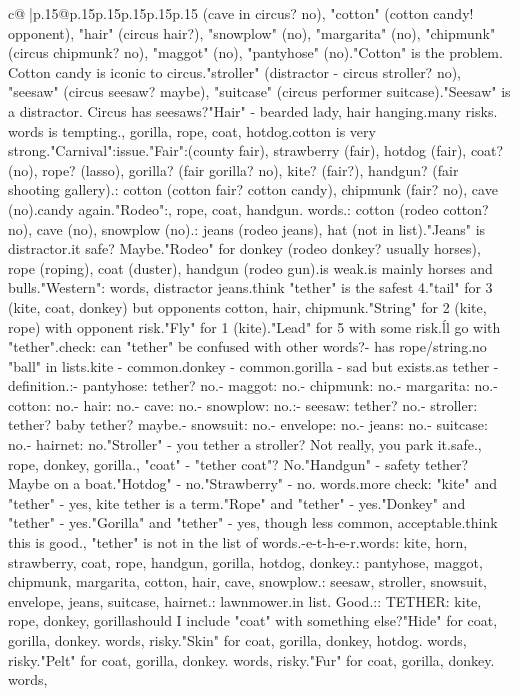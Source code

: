 \documentclass{article}
\begin{document}
{\begin{supertabular}{c@{$\;$}|p{.15\linewidth}@{}p{.15\linewidth}p{.15\linewidth}p{.15\linewidth}p{.15\linewidth}p{.15\linewidth}}
{{{(cave in circus? no), "cotton" (cotton candy! opponent), "hair" (circus hair?), "snowplow" (no), "margarita" (no), "chipmunk" (circus chipmunk? no), "maggot" (no), "pantyhose" (no).\n"Cotton" is the problem. Cotton candy is iconic to circus.\nAlso "stroller" (distractor - circus stroller? no), "seesaw" (circus seesaw? maybe), "suitcase" (circus performer suitcase).\n"Seesaw" is a distractor. Circus has seesaws?\n"Hair" - bearded lady, hair hanging.\nSo many risks. words is tempting.\nDonkey, gorilla, rope, coat, hotdog.\nBut cotton is very strong.\n\n"Carnival":\nSame issue.\n\n"Fair":\nDonkey (county fair), strawberry (fair), hotdog (fair), coat? (no), rope? (lasso), gorilla? (fair gorilla? no), kite? (fair?), handgun? (fair shooting gallery).\nOpponents: cotton (cotton fair? cotton candy), chipmunk (fair? no), cave (no).\nCotton candy again.\n\n"Rodeo":\nDonkey, rope, coat, handgun. words.\nOpponents: cotton (rodeo cotton? no), cave (no), snowplow (no).\nDistractors: jeans (rodeo jeans), hat (not in list).\n"Jeans" is distractor.\nIs it safe? Maybe.\n"Rodeo" for donkey (rodeo donkey? usually horses), rope (roping), coat (duster), handgun (rodeo gun).\nDonkey is weak.\nRodeo is mainly horses and bulls.\n\n"Western": words, distractor jeans.\n\nI think "tether" is the safest 4.\n\nOr "tail" for 3 (kite, coat, donkey) but opponents cotton, hair, chipmunk.\n\n"String" for 2 (kite, rope) with opponent risk.\n\n"Fly" for 1 (kite).\n\n"Lead" for 5 with some risk.\n\nI\'ll go with "tether".\n\nFinal check: can "tether" be confused with other words?\nTetherball - has rope/string.\nBut no "ball" in lists.\nTethered kite - common.\nTethered donkey - common.\nTethered gorilla - sad but exists.\nRope as tether - definition.\n\nOpponents:\n- pantyhose: tether? no.\n- maggot: no.\n- chipmunk: no.\n- margarita: no.\n- cotton: no.\n- hair: no.\n- cave: no.\n- snowplow: no.\n\nDistractors:\n- seesaw: tether? no.\n- stroller: tether? baby tether? maybe.\n- snowsuit: no.\n- envelope: no.\n- jeans: no.\n- suitcase: no.\n- hairnet: no.\n\n"Stroller" - you tether a stroller? Not really, you park it.\nSo safe.\n\nKite, rope, donkey, gorilla.\n\nActually, "coat" - "tether coat"? No.\n"Handgun" - safety tether? Maybe on a boat.\n"Hotdog" - no.\n"Strawberry" - no.\n{} words.\n\nOne more check: "kite" and "tether" - yes, kite tether is a term.\n"Rope" and "tether" - yes.\n"Donkey" and "tether" - yes.\n"Gorilla" and "tether" - yes, though less common, acceptable.\n\nI think this is good.\n\nWait, "tether" is not in the list of words.\nt-e-t-h-e-r.\nMy words: kite, horn, strawberry, coat, rope, handgun, gorilla, hotdog, donkey.\nOpponent: pantyhose, maggot, chipmunk, margarita, cotton, hair, cave, snowplow.\nDistractor: seesaw, stroller, snowsuit, envelope, jeans, suitcase, hairnet.\nKill: lawnmower.\nNot in list. Good.\n\nFormat:\nCLUE: TETHER\nTARGETS: kite, rope, donkey, gorilla\n\nOr should I include "coat" with something else?\n\n"Hide" for coat, gorilla, donkey. words, risky.\n\n"Skin" for coat, gorilla, donkey, hotdog. words, risky.\n\n"Pelt" for coat, gorilla, donkey. words, risky.\n\n"Fur" for coat, gorilla, donkey. words, }}}
\end{supertabular}}
\end{document}
